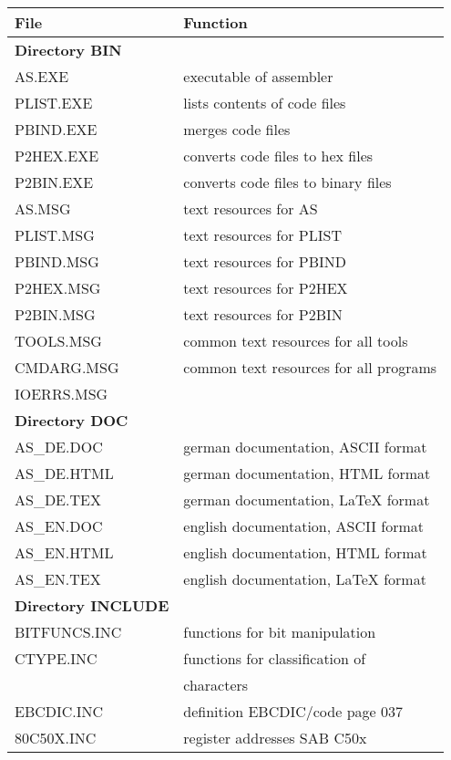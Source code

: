 \documentclass[12pt,twoside]{report}
\begin{document}
\begin{center}\begin{longtable}{|l|l|}
\hline
File              & Function \\
\hline
\hline
\endhead
{\bf Directory BIN} & \\
\hline
AS.EXE            & executable of assembler \\
PLIST.EXE         & lists contents of code files \\
PBIND.EXE         & merges code files \\
P2HEX.EXE         & converts code files to hex files \\
P2BIN.EXE         & converts code files to binary files \\
AS.MSG            & text resources for AS \\
PLIST.MSG         & text resources for PLIST \\
PBIND.MSG         & text resources for PBIND \\
P2HEX.MSG         & text resources for P2HEX \\
P2BIN.MSG         & text resources for P2BIN \\
TOOLS.MSG         & common text resources for all tools \\
CMDARG.MSG        & common text resources for all programs \\
IOERRS.MSG        & \\
\hline
{\bf Directory DOC} & \\
\hline
AS\_DE.DOC        & german documentation, ASCII format \\
AS\_DE.HTML       & german documentation, HTML format \\
AS\_DE.TEX        & german documentation, LaTeX format \\
AS\_EN.DOC        & english documentation, ASCII format \\
AS\_EN.HTML       & english documentation, HTML format \\
AS\_EN.TEX        & english documentation, LaTeX format \\
\hline
{\bf Directory INCLUDE} & \\
\hline
BITFUNCS.INC      & functions for bit manipulation \\
CTYPE.INC         & functions for classification of \\
                  & characters \\
EBCDIC.INC        & definition EBCDIC/code page 037 \\
80C50X.INC        & register addresses SAB C50x \\

\end{longtable}
\end{center}
\end{document}
